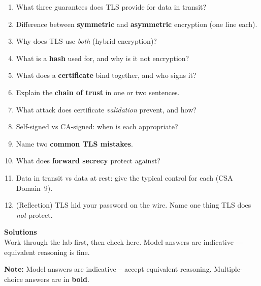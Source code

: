 \documentclass[11pt]{article}
\begin{document}
\begin{enumerate}
\item What three guarantees does TLS provide for data in transit?
\item Difference between \textbf{symmetric} and \textbf{asymmetric} encryption (one line each).
\item Why does TLS use \emph{both} (hybrid encryption)?
\item What is a \textbf{hash} used for, and why is it not encryption?
\item What does a \textbf{certificate} bind together, and who signs it?
\item Explain the \textbf{chain of trust} in one or two sentences.
\item What attack does certificate \emph{validation} prevent, and how?
\item Self-signed vs CA-signed: when is each appropriate?
\item Name two \textbf{common TLS mistakes}.
\item What does \textbf{forward secrecy} protect against?
\item Data in transit vs data at rest: give the typical control for each (CSA Domain~9).
\item (Reflection) TLS hid your password on the wire. Name one thing TLS does \emph{not} protect.
\end{enumerate}

\signoff

\clearpage
\solheader
{\LARGE\bfseries\color{kred} Solutions}\\[2pt]
{\small Work through the lab first, then check here. Model answers are indicative — equivalent reasoning is fine.}\par\vspace{8pt}
\noindent\textbf{Note:} Model answers are indicative -- accept equivalent reasoning. Multiple-choice
answers are in \textbf{bold}.
\end{document}
